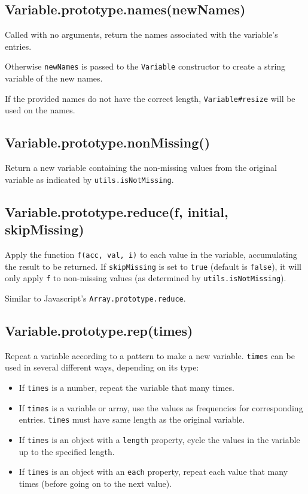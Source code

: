 \documentclass{article}
\begin{document}
    \subsection{Variable.prototype.names(newNames)}
    Called with no arguments, return the names associated with the variable's
entries.


Otherwise \texttt{newNames} is passed to the \texttt{Variable} constructor to create a
string variable of the new names.


If the provided names do not have the correct length, \texttt{Variable\#resize}
will be used on the names.


    \subsection{Variable.prototype.nonMissing()}
    Return a new variable containing the non-missing values from the original
variable as indicated by \texttt{utils.isNotMissing}.


    \subsection{Variable.prototype.reduce(f, initial, skipMissing)}
    Apply the function \texttt{f(acc, val, i)} to each value in the variable, accumulating
the result to be returned.
If \texttt{skipMissing} is set to \texttt{true} (default is \texttt{false}), it will only apply
\texttt{f} to non-missing values (as determined by \texttt{utils.isNotMissing}).


Similar to Javascript's \texttt{Array.prototype.reduce}.


    \subsection{Variable.prototype.rep(times)}
    Repeat a variable according to a pattern to make a new variable.
\texttt{times} can be used in several different ways, depending on its type:


\begin{itemize}

\item If \texttt{times} is a number, repeat the variable that many times.

\item If \texttt{times} is a variable or array, use the values as frequencies for
corresponding entries. \texttt{times} must have same length as the original variable.

\item If \texttt{times} is an object with a \texttt{length} property, cycle the values in the
variable up to the specified length.

\item If \texttt{times} is an object with an \texttt{each} property, repeat each value that
many times (before going on to the next value).

\end{itemize}
\end{document}
